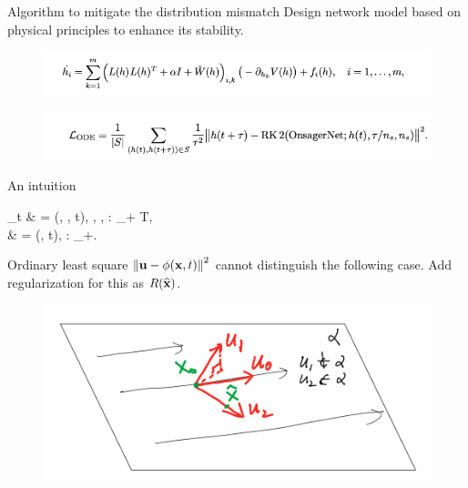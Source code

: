 \documentclass{beamer}
\begin{document}
\begin{frame}{Algorithm to mitigate the distribution mismatch}
	Design network model based on physical principles to enhance its stability.
	\begin{figure}[H]
          \centering
          \centerline{\includegraphics[width=\linewidth]{fig/onsager1.png}}
        \end{figure}
        \begin{figure}[H]
          \centering
          \centerline{\includegraphics[width=\linewidth]{fig/onsager2.png}}
        \end{figure}
\end{frame}


\begin{frame}{An intuition}	
	\bequn
		\begin{aligned}
			\p_t \mfx & = \mcL(\mfx, \mfu, t), \quad \mfx \in \mcX, \mfu \in \mcU, \mcL: \mcX \times \mcU \times \mbR_+ \rightarrow T\mcX,			\\
			\mfu & = \phi(\mfx, t), \quad \phi: \mcX \times \mbR_+\rightarrow \mfu.
		\end{aligned}
	\eequn
	Ordinary least square $\left\| \mathbf{u} - \phi(\mathbf{x}, t) \right\|^2$ cannot distinguish the following case. Add regularization for this as $R(\widehat {\mathbf{x}})$.
	\begin{figure}[H]
          \centering
          \centerline{\includegraphics[width=\linewidth]{fig/mfd.png}}
        \end{figure}
\end{frame}
\end{document}
